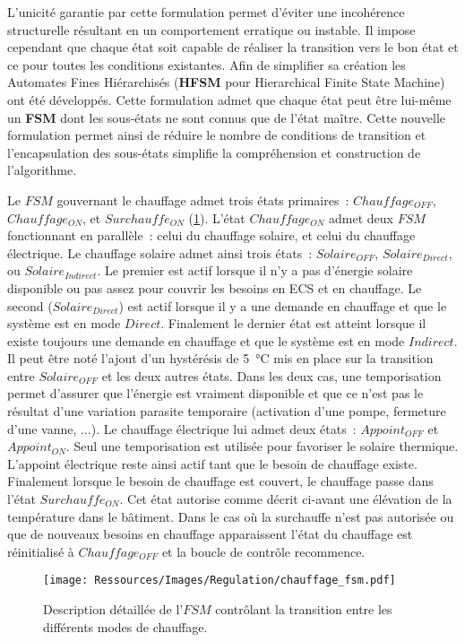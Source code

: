 L’unicité garantie par cette formulation permet d’éviter une incohérence structurelle
résultant en un comportement erratique ou instable. Il impose cependant que chaque état
soit capable de réaliser la transition vers le bon état et ce pour toutes les conditions
existantes. Afin de simplifier sa création les Automates Fines Hiérarchisés (\textbf{HFSM}
pour Hierarchical Finite State Machine) ont été développés. Cette formulation admet que
chaque état peut être lui-même un \textbf{FSM} dont les sous-états ne sont connus que de
l’état maître. Cette nouvelle formulation permet ainsi de réduire le nombre de conditions
de transition et l’encapsulation des sous-états simplifie la compréhension et construction
de l’algorithme.


Le $FSM$ gouvernant le chauffage admet trois états primaires~: $Chauffage_{OFF}$,
$Chauffage_{ON}$, et $Surchauffe_{ON}$ (\ref{fig:automate_chauffage}). L’état
$Chauffage_{ON}$ admet deux $FSM$ fonctionnant en parallèle~: celui du chauffage
solaire, et celui du chauffage électrique. Le chauffage solaire admet ainsi trois états~:
$Solaire_{OFF}$, $Solaire_{Direct}$, ou $Solaire_{Indirect}$. Le premier est actif lorsque
il n’y a pas d’énergie solaire disponible ou pas assez pour couvrir les besoins en ECS et
en chauffage. Le second ($Solaire_{Direct}$) est actif lorsque il y a une demande en
chauffage et que le système est en mode $Direct$. Finalement le dernier état est atteint
lorsque il existe toujours une demande en chauffage et que le système est en mode
$Indirect$.
Il peut être noté l’ajout d’un hystérésis de \SI{5}{\celsius} mis en place sur la
transition entre $Solaire_{OFF}$ et les deux autres états. Dans les deux cas, une
temporisation permet d’assurer que l’énergie est vraiment disponible et que ce n’est pas
le résultat d’une variation parasite temporaire (activation d’une pompe, fermeture d’une
vanne, ...). Le chauffage électrique lui admet deux états~: $Appoint_{OFF}$ et
$Appoint_{ON}$. Seul une temporisation est utilisée pour favoriser le solaire thermique.
L’appoint électrique reste ainsi actif tant que le besoin de chauffage existe. Finalement
lorsque le besoin de chauffage est couvert, le chauffage passe dans l’état
$Surchauffe_{ON}$. Cet état autorise comme décrit ci-avant une élévation de la température
dans le bâtiment. Dans le cas où la surchauffe n’est pas autorisée ou que de nouveaux
besoins en chauffage apparaissent l’état du chauffage est réinitialisé à $Chauffage_{OFF}$
et la boucle de contrôle recommence.

\begin{figure}
    \begin{center}
        \texttt{[image: Ressources/Images/Regulation/chauffage\_fsm.pdf]}
    \end{center}
    \caption{Description détaillée de l’$FSM$ contrôlant la transition entre
             les différents modes de chauffage.
             \label{fig:automate_chauffage}}
\end{figure}


